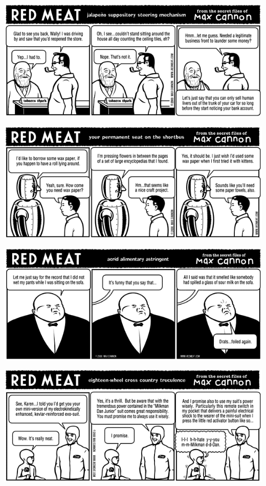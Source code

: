 \documentclass[a4paper,twoside,11pt]{article}
\begin{document}
\includegraphics[width=\textwidth]{redmeat_2000-08-29.png}



\includegraphics[width=\textwidth]{redmeat_2000-09-05.png}



\includegraphics[width=\textwidth]{redmeat_2000-09-12.png}



\includegraphics[width=\textwidth]{redmeat_2000-09-19.png}
\end{document}
